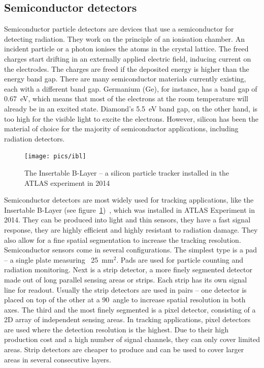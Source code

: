 \documentclass[twoside,12pt]{packages/mytustyle}  %
\begin{document}


\subsection{Semiconductor detectors}
Semiconductor particle detectors are devices that use a semiconductor for detecting radiation. They work on the principle of an ionisation chamber. An incident particle or a photon ionises the atoms in the crystal lattice. The freed charges start drifting in an externally applied electric field, inducing current on the electrodes. The charges are freed if the deposited energy is higher than the energy band gap. There are many semiconductor materials currently existing, each with a different band gap. Germanium (Ge), for instance, has a band gap of 0.67~eV, which means that most of the electrons at the room temperature will already be in an excited state. Diamond's 5.5~eV band gap, on the other hand, is too high for the visible light to excite the electrons. However, silicon has been the material of choice for the majority of semiconductor applications, including radiation detectors. 
\begin{figure}[!t]
\centering
\texttt{[image: pics/ibl]}
\caption{The Insertable B-Layer -- a silicon particle tracker installed in the ATLAS experiment in 2014 \cite{MarcelloniDeOliveira:1702006}}
\label{fig:ibl}
\end{figure}
Semiconductor detectors are most widely used for tracking applications, like the Insertable B-Layer (see figure~\ref{fig:ibl})~\cite{Pernegger:1985432}, which was installed in ATLAS Experiment in 2014. They can be produced into light and thin sensors, they have a fast signal response, they are highly efficient and highly resistant to radiation damage. They also allow for a fine spatial segmentation to increase the tracking resolution. Semiconductor sensors come in several configurations. The simplest type is a pad -- a single plate measuring ~25~mm$^2$. Pads are used for particle counting and radiation monitoring. Next is a strip detector, a more finely segmented detector made out of long parallel sensing areas or strips. Each strip has its own signal line for readout. Usually the strip detectors are used in pairs -- one detector is placed on top of the other at a 90\textdegree~angle to increase spatial resolution in both axes. The third and the most finely segmented is a pixel detector, consisting of a 2D array of independent sensing areas. In tracking applications, pixel detectors are used where the detection resolution is the highest. Due to their high production cost and a high number of signal channels, they can only cover limited areas. Strip detectors are cheaper to produce and can be used to cover larger areas in several consecutive layers.
\end{document}

